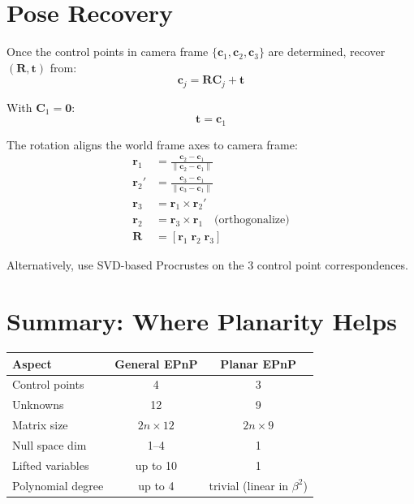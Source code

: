\documentclass[11pt]{article}
\newcommand{\vect}[1]{\mathbf{#1}}
\newcommand{\mat}[1]{\mathbf{#1}}
\newcommand{\planar}[1]{\colorbox{yellow!30}{#1}}
\begin{document}
\section{Pose Recovery}

Once the control points in camera frame $\{\vect{c}_1, \vect{c}_2, \vect{c}_3\}$ are determined, recover $(\mat{R}, \vect{t})$ from:
\[
\vect{c}_j = \mat{R}\vect{C}_j + \vect{t}
\]

With $\vect{C}_1 = \vect{0}$:
\[
\vect{t} = \vect{c}_1
\]

The rotation aligns the world frame axes to camera frame:
\begin{align}
\vect{r}_1 &= \frac{\vect{c}_2 - \vect{c}_1}{\|\vect{c}_2 - \vect{c}_1\|} \\
\vect{r}_2' &= \frac{\vect{c}_3 - \vect{c}_1}{\|\vect{c}_3 - \vect{c}_1\|} \\
\vect{r}_3 &= \vect{r}_1 \times \vect{r}_2' \\
\vect{r}_2 &= \vect{r}_3 \times \vect{r}_1 \quad \text{(orthogonalize)}\\
\mat{R} &= [\vect{r}_1 \; \vect{r}_2 \; \vect{r}_3]
\end{align}

Alternatively, use SVD-based Procrustes on the 3 control point correspondences.

\section{Summary: Where Planarity Helps}

\begin{center}
\begin{tabular}{|l|c|c|}
\hline
\textbf{Aspect} & \textbf{General EPnP} & \textbf{Planar EPnP} \\
\hline
Control points & 4 & \planar{3} \\
Unknowns & 12 & \planar{9} \\
Matrix size & $2n \times 12$ & \planar{$2n \times 9$} \\
Null space dim & 1--4 & \planar{1} \\
Lifted variables & up to 10 & \planar{1} \\
Polynomial degree & up to 4 & \planar{trivial (linear in $\beta^2$)} \\
\hline
\end{tabular}
\end{center}

\vspace{1em}
\end{document}
